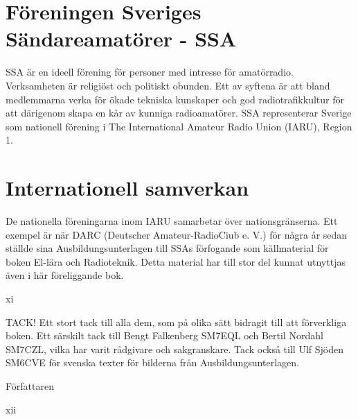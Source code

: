 \section*{Föreningen Sveriges Sändareamatörer - SSA}

SSA är en ideell förening för personer med
intresse för amatörradio. Verksamheten är
religiöst och politiskt obunden. Ett av syftena
är att bland medlemmarna verka för ökade
tekniska kunskaper och god radiotrafikkultur
för att därigenom skapa en kår av kunniga
radioamatörer. SSA representerar Sverige
som nationell förening i The International
Amateur Radio Union (IARU), Region 1.

\section*{Internationell samverkan}

De nationella föreningarna inom IARU samarbetar över nationsgränserna. Ett exempel
är när DARC (Deutscher Amateur-RadioCiub e. V.) för några år sedan ställde sina
Ausbildungsunterlagen till SSAs förfogande
som källmaterial för boken El-lära och Radioteknik.
Detta material har till stor del kunnat
utnyttjas även i här föreliggande bok.

xi

\clearpage

TACK!
Ett stort tack till alla dem, som på olika sätt
bidragit till att förverkliga boken.
Ett särskilt tack till Bengt Falkenberg
SM7EQL och Bertil Nordahl SM7CZL, vilka
har varit rådgivare och sakgranskare.
Tack också till Ulf Sjöden SM6CVE för
svenska texter för bilderna från Ausbildungsunterlagen.

Författaren

xii
